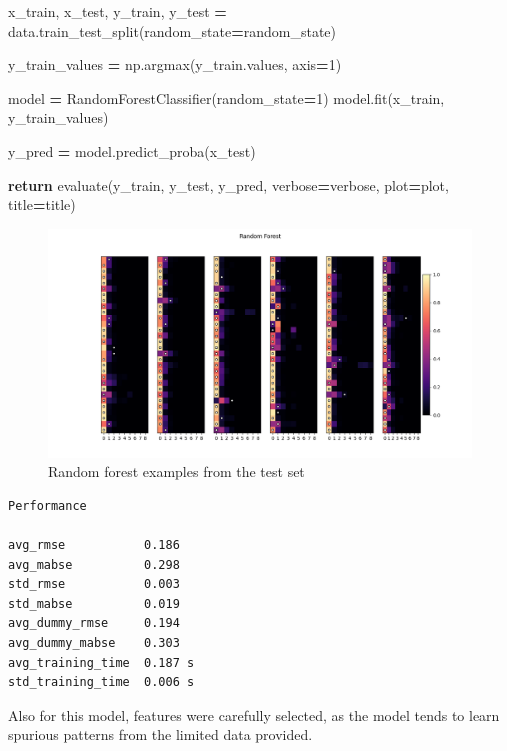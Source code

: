 \documentclass[
]{article}
\newenvironment{Shaded}{\begin{snugshade}}{\end{snugshade}}
\newcommand{\ControlFlowTok}[1]{\textcolor[rgb]{0.13,0.29,0.53}{\textbf{#1}}}
\newcommand{\DecValTok}[1]{\textcolor[rgb]{0.00,0.00,0.81}{#1}}
\newcommand{\NormalTok}[1]{#1}
\newcommand{\OperatorTok}[1]{\textcolor[rgb]{0.81,0.36,0.00}{\textbf{#1}}}
\begin{document}
\begin{Shaded}
\begin{Highlighting}[]
\NormalTok{    x\_train, x\_test, y\_train, y\_test }\OperatorTok{=}\NormalTok{ data.train\_test\_split(random\_state}\OperatorTok{=}\NormalTok{random\_state)}

\NormalTok{    y\_train\_values }\OperatorTok{=}\NormalTok{ np.argmax(y\_train.values, axis}\OperatorTok{=}\DecValTok{1}\NormalTok{)}

\NormalTok{    model }\OperatorTok{=}\NormalTok{ RandomForestClassifier(random\_state}\OperatorTok{=}\DecValTok{1}\NormalTok{)}
\NormalTok{    model.fit(x\_train, y\_train\_values)}

\NormalTok{    y\_pred }\OperatorTok{=}\NormalTok{ model.predict\_proba(x\_test)}

    \ControlFlowTok{return}\NormalTok{ evaluate(y\_train, y\_test, y\_pred, verbose}\OperatorTok{=}\NormalTok{verbose, plot}\OperatorTok{=}\NormalTok{plot, title}\OperatorTok{=}\NormalTok{title)}
\end{Highlighting}
\end{Shaded}

\begin{figure}
\centering
\includegraphics{figures/random_forest.png}
\caption{Random forest examples from the test set}
\end{figure}

\begin{verbatim}
Performance

avg_rmse           0.186
avg_mabse          0.298
std_rmse           0.003
std_mabse          0.019
avg_dummy_rmse     0.194
avg_dummy_mabse    0.303
avg_training_time  0.187 s
std_training_time  0.006 s
\end{verbatim}

Also for this model, features were carefully selected, as the model
tends to learn spurious patterns from the limited data provided.
\end{document}
